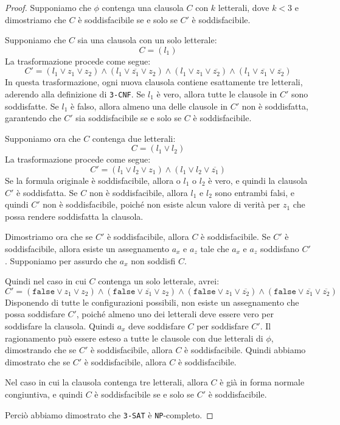 \begin{proof}
    Supponiamo che $\phi$ contenga una clausola $C$ con $k$ letterali, dove $k < 3$ 
    e dimostriamo che $C$ è soddisfacibile se e solo se $C'$ è soddisfacibile.

    Supponiamo che $C$ sia una clausola con un solo letterale:
    \[
        C = (l_1)
    \]
    La trasformazione procede come segue:
    \[
        C' = (l_1 \lor z_1 \lor z_2) \land (l_1 \lor
        \overline{z_1} \lor z_2) \land (l_1 \lor z_1 \lor \overline{z_2})
        \land (l_1 \lor \overline{z_1} \lor \overline{z_2})
    \]
    In questa trasformazione, ogni nuova clausola contiene esattamente tre letterali,
    aderendo alla definizione di \texttt{3-CNF}. Se $l_1$ è vero, allora tutte le
    clausole in $C'$ sono soddisfatte. Se $l_1$ è falso, allora almeno una delle
    clausole in $C'$ non è soddisfatta, garantendo che $C'$ sia soddisfacibile se e
    solo se $C$ è soddisfacibile.

    Supponiamo ora che $C$ contenga due letterali:
    \[
        C = (l_1 \lor l_2)
    \]
    La trasformazione procede come segue:
    \[
        C' = (l_1 \lor l_2 \lor z_1) \land (l_1 \lor l_2 \lor \overline{z_1})
    \]
    Se la formula originale è soddisfacibile, allora o $l_1$ o $l_2$ è vero, e
    quindi la clausola $C'$ è soddisfatta. Se $C$ non è soddisfacibile, allora
    $l_1$ e $l_2$ sono entrambi falsi, e quindi $C'$ non è soddisfacibile, poiché 
    non esiste alcun valore di verità per $z_1$ che possa rendere soddisfatta la
    clausola.

    Dimostriamo ora che se $C'$ è soddisfacibile, allora $C$ è soddisfacibile.
    Se $C'$ è soddisfacibile, allora esiste un assegnamento $a_x$ e $a_z$ tale che
    $a_x$ e $a_z$ soddisfano $C'$. Supponiamo per assurdo che $a_x$ non soddisfi $C$.
    
    Quindi nel caso in cui $C$ contenga un solo letterale, avrei:
    \[
        C' = (\texttt{false} \lor z_1 \lor z_2) \land
        (\texttt{false} \lor \overline{z_1} \lor z_2)
        \land (\texttt{false} \lor z_1 \lor \overline{z_2}) \land
        (\texttt{false} \lor \overline{z_1} \lor \overline{z_2})
    \]
    Disponendo di tutte le configurazioni possibili, non esiste un assegnamento
    che possa soddisfare $C'$, poiché almeno uno dei letterali deve essere vero
    per soddisfare la clausola. Quindi $a_x$ deve soddisfare $C$ per soddisfare
    $C'$. Il ragionamento può essere esteso a tutte le clausole con due letterali
    di $\phi$, dimostrando che se $C'$ è soddisfacibile, allora $C$ è soddisfacibile.
    Quindi abbiamo dimostrato che se $C'$ è soddisfacibile, allora $C$ è soddisfacibile.

    Nel caso in cui la clausola contenga tre letterali, allora $C$ è già in forma
    normale congiuntiva, e quindi $C$ è soddisfacibile se e solo se $C'$ è soddisfacibile.

    Perciò abbiamo dimostrato che \texttt{3-SAT} è \texttt{NP}-completo.
\end{proof}
